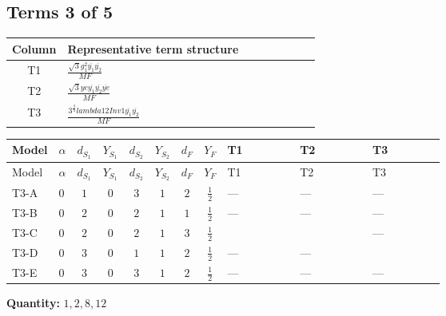 \documentclass[8pt]{article}
\begin{document}
\begin{landscape}
\subsection*{Terms 3 of 5}
\begin{center}
\begin{tabular}{@{}c >{\raggedright\arraybackslash}p{0.82\linewidth}@{}}
\toprule
Column & Representative term structure \\
\midrule
T1 & \(\displaystyle \frac{\sqrt{3} g_{1}^{2} \overline{y_{1}} \overline{y_{2}}}{MF}\) \\
\midrule
T2 & \(\displaystyle \frac{\sqrt{3} ye \overline{y_{1}} \overline{y_{2}} \overline{ye}}{MF}\) \\
\midrule
T3 & \(\displaystyle \frac{3^{\frac{3}{4}} lambda12Inv1 \overline{y_{1}} \overline{y_{2}}}{MF}\) \\
\midrule
\bottomrule
\end{tabular}
\end{center}
\smallskip
\tiny
\begin{longtable}{@{}llcccccc >{\raggedright\arraybackslash}p{0.21\linewidth} >{\raggedright\arraybackslash}p{0.21\linewidth} >{\raggedright\arraybackslash}p{0.21\linewidth}@{}}
\toprule
Model & $\alpha$ & $d_{S_1}$ & $Y_{S_1}$ & $d_{S_2}$ & $Y_{S_2}$ & $d_F$ & $Y_F$ & T1 & T2 & T3 \\
\midrule
\endfirsthead
\toprule
Model & $\alpha$ & $d_{S_1}$ & $Y_{S_1}$ & $d_{S_2}$ & $Y_{S_2}$ & $d_F$ & $Y_F$ & T1 & T2 & T3 \\
\midrule
\endhead
T3-A & $0$ & $1$ & $0$ & $3$ & $1$ & $2$ & $\frac{1}{2}$ & --- & --- & --- \\
\midrule
T3-B & $0$ & $2$ & $0$ & $2$ & $1$ & $1$ & $\frac{1}{2}$ & --- & --- & --- \\
\midrule
T3-C & $0$ & $2$ & $0$ & $2$ & $1$ & $3$ & $\frac{1}{2}$ & \scriptsize\adjustbox{max width=\linewidth}{$\begin{gathered} \frac{\sqrt{3} g_{1}^{2} \overline{y_{1}} \overline{y_{2}}}{16 MF}\end{gathered}$} & \scriptsize\adjustbox{max width=\linewidth}{$\begin{gathered} - \frac{\sqrt{3} ye \overline{y_{1}} \overline{y_{2}} \overline{ye}}{24 MF}\end{gathered}$} & --- \\
\midrule
T3-D & $0$ & $3$ & $0$ & $1$ & $1$ & $2$ & $\frac{1}{2}$ & --- & --- & \scriptsize\adjustbox{max width=\linewidth}{$\begin{gathered} \frac{3^{\frac{3}{4}} lambda12Inv1 \overline{y_{1}} \overline{y_{2}}}{6 MF}\end{gathered}$} \\
\midrule
T3-E & $0$ & $3$ & $0$ & $3$ & $1$ & $2$ & $\frac{1}{2}$ & --- & --- & --- \\
\midrule
\bottomrule
\end{longtable}
\clearpage
\noindent\textbf{Quantity: }$\mathrm{1,2,8,12}$\par\smallskip

\end{landscape}
\end{document}
